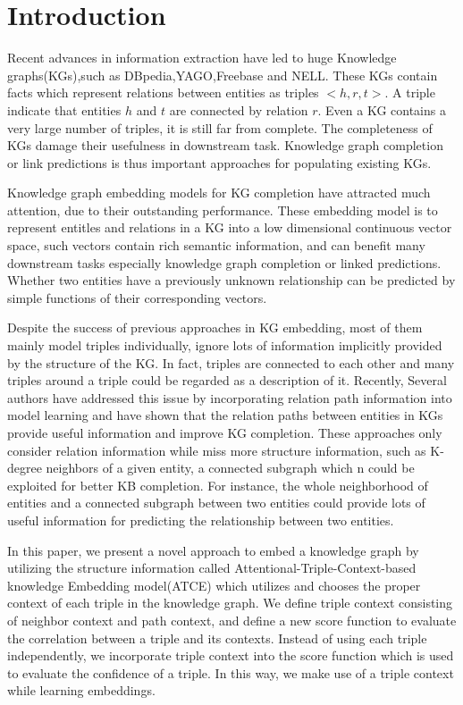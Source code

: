 \section{Introduction}
Recent advances in information extraction have led to huge Knowledge graphs(KGs),such as DBpedia,YAGO,Freebase and NELL. These KGs contain facts which represent relations between entities as triples $<h,r,t>$. A triple indicate that entities $h$ and $t$ are connected by relation $r$. Even a KG contains a very large number of triples, it is still far from complete. The completeness of KGs damage their usefulness in downstream task. Knowledge graph completion or link predictions is thus important approaches for populating existing KGs.

Knowledge graph embedding models for KG completion have attracted much attention, due to their outstanding performance. These embedding model is to represent entitles and relations in a KG into a low dimensional continuous vector space, such vectors contain rich semantic information, and can benefit many downstream tasks especially knowledge graph completion or linked predictions.  Whether two entities have a previously unknown relationship can be predicted by simple functions of their corresponding vectors.

Despite the success of previous approaches in KG embedding, most of them mainly model triples individually, ignore lots of information implicitly provided by the structure of the KG. In fact, triples are connected to each other and many triples around a triple could be regarded as a description of it. Recently, Several authors have addressed this issue by incorporating relation path information into model learning and have shown that the relation paths between entities in KGs provide useful information and improve KG completion. These approaches only consider relation information while miss more structure information, such as K-degree neighbors of a given entity, a connected subgraph which n could be exploited for better KB completion. For instance, the whole neighborhood of entities and a connected subgraph between two entities could provide lots of useful information for predicting the relationship between two entities.

In this paper, we present a novel approach to embed a knowledge graph by utilizing the structure information called Attentional-Triple-Context-based knowledge Embedding model(ATCE) which utilizes and chooses the proper context of each triple in the knowledge graph. We define triple context consisting of neighbor context and path context, and define a new score function to evaluate the correlation between a triple and its contexts. Instead of using each triple independently, we incorporate triple context into the score function which is used to evaluate the confidence of a triple. In this way, we make use of a triple context while learning embeddings.


